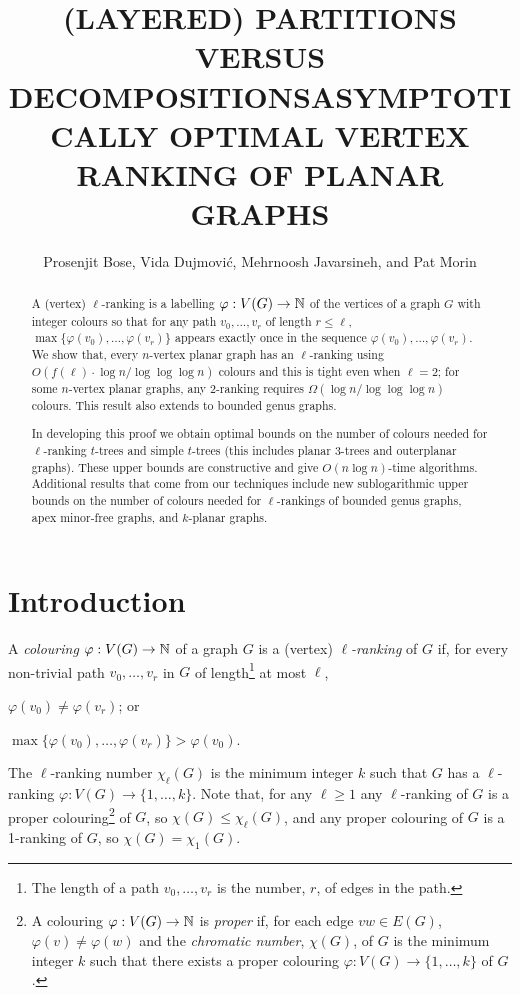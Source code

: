 \documentclass[kpfonts]{patmorin}
\title{\MakeUppercase{(Layered) Partitions versus Decompositions}}
\author{}
\title{\MakeUppercase{Asymptotically Optimal Vertex Ranking of Planar Graphs}}
\author{Prosenjit Bose, Vida Dujmović, Mehrnoosh Javarsineh, and Pat Morin}
\theoremstyle{named}
\begin{document}
\begin{titlepage}
\maketitle

\begin{abstract}
  A (vertex) $\ell$-ranking is a labelling $\varphi:V(G)\to\mathbb{N}$ of the vertices of a graph $G$ with integer colours so that for any path $v_0,\ldots,v_r$ of length $r\le \ell$, $\max\{\varphi(v_0),\ldots,\varphi(v_r)\}$ appears exactly once in the sequence $\varphi(v_0),\ldots,\varphi(v_r)$.  We show that, every $n$-vertex planar graph has an $\ell$-ranking using $O(f(\ell)\cdot\log n/\log\log\log n)$ colours and this is tight even when $\ell=2$; for some $n$-vertex planar graphs, any 2-ranking requires $\Omega(\log n/\log\log\log n)$ colours.  This result also extends to bounded genus graphs.

  In developing this proof we obtain optimal bounds on the number of colours needed for $\ell$-ranking $t$-trees and simple $t$-trees (this includes planar 3-trees and outerplanar graphs).  These upper bounds are constructive and give $O(n\log n)$-time algorithms.  Additional results that come from our techniques include new sublogarithmic upper bounds on the number of colours needed for $\ell$-rankings of bounded genus graphs, apex minor-free graphs, and $k$-planar graphs.
\end{abstract}
\end{titlepage}

\tableofcontents

\newpage
{}

\section{Introduction}


A \emph{colouring} $\varphi:V(G)\to \mathbb{N}$ of a graph $G$ is a (vertex) \emph{$\ell$-ranking} of $G$ if, for every non-trivial path $v_0,\ldots,v_r$ in $G$ of length\footnote{The length of a path $v_0,\ldots,v_r$ is the number, $r$, of edges in the path.} at most $\ell$,
\begin{inparaenum}[(i)]
   \item $\varphi(v_0)\neq \varphi(v_r)$; or
   \item $\max\{\varphi(v_0),\ldots,\varphi(v_r)\} > \varphi(v_0)$.
\end{inparaenum}
The $\ell$-ranking number $\chi_\ell(G)$ is the minimum integer $k$ such that $G$ has a $\ell$-ranking $\varphi:V(G)\to \{1,\ldots,k\}$.  Note that, for any $\ell\ge 1$ any $\ell$-ranking of $G$ is a proper colouring\footnote{A colouring $\varphi:V(G)\to \mathbb{N}$ is \emph{proper} if, for each edge $vw\in E(G)$, $\varphi(v)\neq\varphi(w)$ and the \emph{chromatic number}, $\chi(G)$, of $G$ is the minimum integer $k$ such that there exists a proper colouring $\varphi:V(G)\to\{1,\ldots,k\}$ of $G$.} of $G$, so $\chi(G)\le \chi_\ell(G)$, and any proper colouring of $G$ is a 1-ranking of $G$, so $\chi(G)=\chi_1(G)$.
\end{document}
